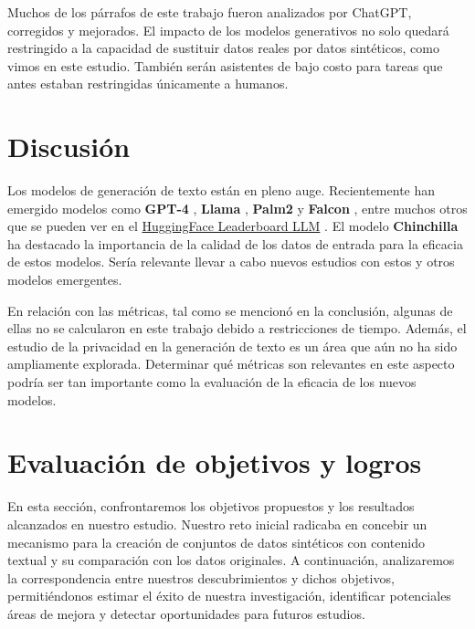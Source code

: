 Muchos de los párrafos de este trabajo fueron analizados por ChatGPT, corregidos y mejorados. El impacto de los modelos generativos no solo quedará restringido a la capacidad de sustituir datos reales por datos sintéticos, como vimos en este estudio. También serán asistentes de bajo costo para tareas que antes estaban restringidas únicamente a humanos.


\section{Discusión}
\label{sec:discusion}
Los modelos de generación de texto están en pleno auge. Recientemente han emergido modelos como \textbf{GPT-4} \cite{openai_gpt-4_2023}, \textbf{Llama} \cite{noauthor_llama_nodate}, \textbf{Palm2} \cite{anil_palm_2023} y \textbf{Falcon} \cite{noauthor_falcon_nodate}, entre muchos otros que se pueden ver en el \href{https://huggingface.co/spaces/HuggingFaceH4/open_llm_leaderboard}{HuggingFace Leaderboard LLM} \cite{noauthor_open_nodate}. El modelo \textbf{Chinchilla} \cite{hoffmann_training_2022} ha destacado la importancia de la calidad de los datos de entrada para la eficacia de estos modelos. Sería relevante llevar a cabo nuevos estudios con estos y otros modelos emergentes.

En relación con las métricas, tal como se mencionó en la conclusión, algunas de ellas no se calcularon en este trabajo debido a restricciones de tiempo. Además, el estudio de la privacidad en la generación de texto es un área que aún no ha sido ampliamente explorada. Determinar qué métricas son relevantes en este aspecto podría ser tan importante como la evaluación de la eficacia de los nuevos modelos.

\newpage
\section{Evaluación de objetivos y logros}
En esta sección, confrontaremos los objetivos propuestos y los resultados alcanzados en nuestro estudio. Nuestro reto inicial radicaba en concebir un mecanismo para la creación de conjuntos de datos sintéticos con contenido textual y su comparación con los datos originales. A continuación, analizaremos la correspondencia entre nuestros descubrimientos y dichos objetivos, permitiéndonos estimar el éxito de nuestra investigación, identificar potenciales áreas de mejora y detectar oportunidades para futuros estudios.

